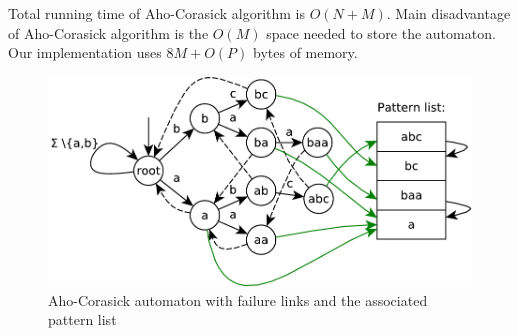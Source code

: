 \documentclass[final]{beamer}
\begin{document}
\begin{poster}
Total running time of Aho-Corasick algorithm is $O(N+M)$.
Main disadvantage of Aho-Corasick algorithm is the $O(M)$ space needed to store the automaton.
Our implementation uses $8M+O(P)$ bytes of memory.

%


%

\begin{figure}
\centering
 \includegraphics[width=25cm]{aho_corasick.pdf}
\caption{Aho-Corasick automaton with failure links and the associated pattern list}
\label{fig:ac_machine}
\end{figure}


\end{poster}
\end{document}
